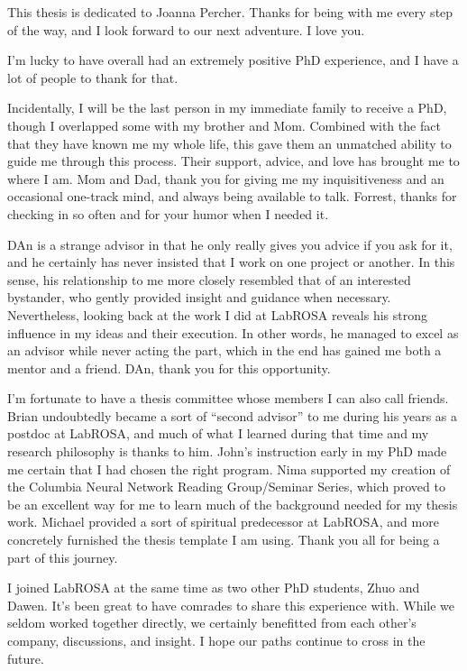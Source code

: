 This thesis is dedicated to Joanna Percher.
Thanks for being with me every step of the way, and I look forward to our next adventure.
I love you.

I'm lucky to have overall had an extremely positive PhD experience, and I have a lot of people to thank for that.

Incidentally, I will be the last person in my immediate family to receive a PhD, though I overlapped some with my brother and Mom.
Combined with the fact that they have known me my whole life, this gave them an unmatched ability to guide me through this process.
Their support, advice, and love has brought me to where I am.
Mom and Dad, thank you for giving me my inquisitiveness and an occasional one-track mind, and always being available to talk.
Forrest, thanks for checking in so often and for your humor when I needed it.

DAn is a strange advisor in that he only really gives you advice if you ask for it, and he certainly has never insisted that I work on one project or another.
In this sense, his relationship to me more closely resembled that of an interested bystander, who gently provided insight and guidance when necessary.
Nevertheless, looking back at the work I did at LabROSA reveals his strong influence in my ideas and their execution.
In other words, he managed to excel as an advisor while never acting the part, which in the end has gained me both a mentor and a friend.
DAn, thank you for this opportunity.

I'm fortunate to have a thesis committee whose members I can also call friends.
Brian undoubtedly became a sort of ``second advisor'' to me during his years as a postdoc at LabROSA, and much of what I learned during that time and my research philosophy is thanks to him.
John's instruction early in my PhD made me certain that I had chosen the right program.
Nima supported my creation of the Columbia Neural Network Reading Group/Seminar Series, which proved to be an excellent way for me to learn much of the background needed for my thesis work.
Michael provided a sort of spiritual predecessor at LabROSA, and more concretely furnished the thesis template I am using.
Thank you all for being a part of this journey.

I joined LabROSA at the same time as two other PhD students, Zhuo and Dawen.
It's been great to have comrades to share this experience with.
While we seldom worked together directly, we certainly benefitted from each other's company, discussions, and insight.
I hope our paths continue to cross in the future.

